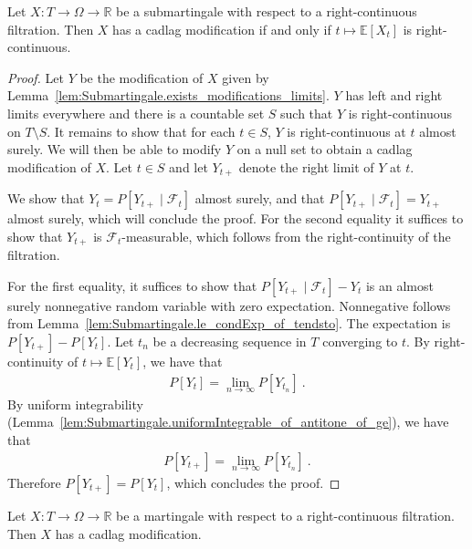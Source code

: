 \begin{theorem}\label{thm:Submartingale.exists_cadlag_modification_iff_rightContinuous}
Let $X : T \to \Omega \to \mathbb{R}$ be a submartingale with respect to a right-continuous filtration.
Then $X$ has a cadlag modification if and only if $t \mapsto \mathbb{E}[X_t]$ is right-continuous.
\end{theorem}

\begin{proof}
Let $Y$ be the modification of $X$ given by Lemma~\ref{lem:Submartingale.exists_modifications_limits}.
$Y$ has left and right limits everywhere and there is a countable set $S$ such that $Y$ is right-continuous on $T \setminus S$.
It remains to show that for each $t \in S$, $Y$ is right-continuous at $t$ almost surely. We will then be able to modify $Y$ on a null set to obtain a cadlag modification of $X$.
Let $t \in S$ and let $Y_{t+}$ denote the right limit of $Y$ at $t$.

We show that $Y_t = P[Y_{t+} \mid \mathcal{F}_t]$ almost surely, and that $P[Y_{t+} \mid \mathcal{F}_t] = Y_{t+}$ almost surely, which will conclude the proof.
For the second equality it suffices to show that $Y_{t+}$ is $\mathcal{F}_t$-measurable, which follows from the right-continuity of the filtration.

For the first equality, it suffices to show that $P[Y_{t+} \mid \mathcal{F}_t] - Y_t$ is an almost surely nonnegative random variable with zero expectation.
Nonnegative follows from Lemma~\ref{lem:Submartingale.le_condExp_of_tendsto}.
The expectation is $P[Y_{t+}] - P[Y_t]$. Let $t_n$ be a decreasing sequence in $T$ converging to $t$.
By right-continuity of $t \mapsto \mathbb{E}[Y_t]$, we have that
\begin{align*}
  P[Y_t] = \lim_{n \to \infty} P[Y_{t_n}]
  \: .
\end{align*}
By uniform integrability (Lemma~\ref{lem:Submartingale.uniformIntegrable_of_antitone_of_ge}), we have that
\begin{align*}
  P[Y_{t+}] = \lim_{n \to \infty} P[Y_{t_n}]
  \: .
\end{align*}
Therefore $P[Y_{t+}] = P[Y_t]$, which concludes the proof.
\end{proof}


\begin{theorem}\label{thm:Martingale.exists_cadlag_modification}
Let $X : T \to \Omega \to \mathbb{R}$ be a martingale with respect to a right-continuous filtration.
Then $X$ has a cadlag modification.
\end{theorem}

